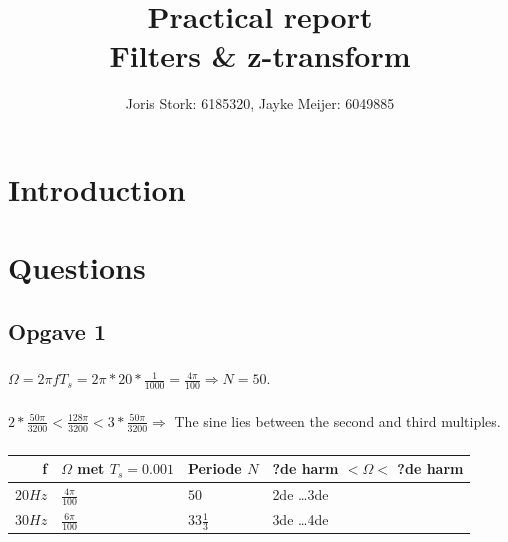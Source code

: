 \documentclass[a4paper, 12pt, titlepage]{article}
\author{Joris Stork: 6185320, Jayke Meijer: 6049885}
\title{Practical report\\ Filters \& z-transform}
\begin{document}
\maketitle
\section{Introduction}
\section{Questions}
\subsection{Opgave 1}
\subsubsection{}
$ \Omega = 2 \pi f T_s = 2 \pi * 20 * \frac{1}{1000} = \frac{4\pi}{100}
\Rightarrow N = 50$.
\subsubsection{}
$2 * \frac{50\pi}{3200} < \frac{128 \pi}{3200} < 3 *
\frac{50\pi}{3200}\Rightarrow$ The
sine lies between the second and third multiples.
\subsubsection{}
\begin{tabular}{r || l | l | l}
    f & $\Omega$ met $T_s = 0.001$  & Periode $N$ & ?de harm $< \Omega<$ ?de
    harm \\ \hline \hline
    $20 Hz$ & $\frac{4\pi}{100}$ & $50$ & 2de \dots 3de \\ \hline
    $30 Hz$ & $\frac{6\pi}{100}$ & $33\frac{1}{3}$ & 3de \dots 4de \\ 
\end{tabular}
\end{document}
